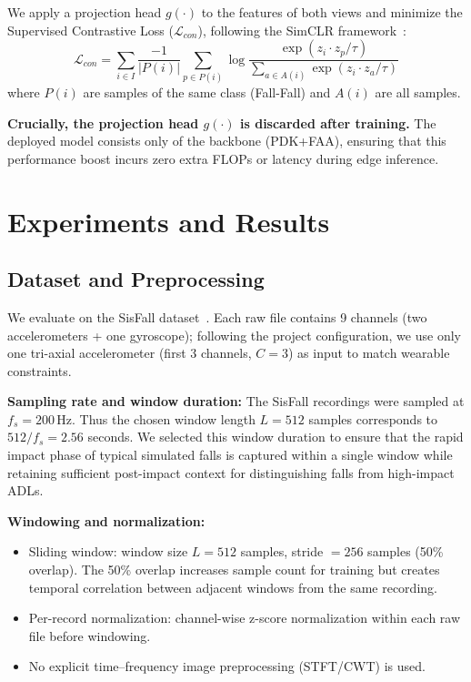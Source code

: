 \documentclass{article}
\begin{document}
We apply a projection head $g(\cdot)$ to the features of both views and minimize the Supervised Contrastive Loss ($\mathcal{L}_{con}$), following the SimCLR framework~\cite{chen2020simclr}:
\begin{equation}
\mathcal{L}_{con} = \sum_{i \in I} \frac{-1}{|P(i)|} \sum_{p \in P(i)} \log \frac{\exp(z_i \cdot z_p / \tau)}{\sum_{a \in A(i)} \exp(z_i \cdot z_a / \tau)}
\end{equation}
where $P(i)$ are samples of the same class (Fall-Fall) and $A(i)$ are all samples.

\textbf{Crucially, the projection head $g(\cdot)$ is discarded after training.} The deployed model consists only of the backbone (PDK+FAA), ensuring that this performance boost incurs zero extra FLOPs or latency during edge inference.


\section{Experiments and Results}

\subsection{Dataset and Preprocessing}

We evaluate on the SisFall dataset~\cite{sucerquia2017sisfall}. Each raw file contains 9 channels (two accelerometers + one gyroscope); following the project configuration, we use only one tri-axial accelerometer (first 3 channels, $C=3$) as input to match wearable constraints.

\textbf{Sampling rate and window duration:} The SisFall recordings were sampled at $f_s = 200\,\mathrm{Hz}$. Thus the chosen window length $L=512$ samples corresponds to $512 / f_s = 2.56$ seconds. We selected this window duration to ensure that the rapid impact phase of typical simulated falls is captured within a single window while retaining sufficient post-impact context for distinguishing falls from high-impact ADLs.

\textbf{Windowing and normalization:}
\begin{itemize}
    \item Sliding window: window size $L=512$ samples, stride $=256$ samples (50\% overlap). The 50\% overlap increases sample count for training but creates temporal correlation between adjacent windows from the same recording.
    \item Per-record normalization: channel-wise z-score normalization within each raw file before windowing.
    \item No explicit time--frequency image preprocessing (STFT/CWT) is used.
\end{itemize}
\end{document}
